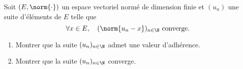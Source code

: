 \begin{enonce}
\begin{exercise}[ID={RMS135 E1441},subtitle={IMT MP 2024},tags={},difficulty={}]

Soit $(E, \norm{\cdot})$ un espace vectoriel normé de dimension finie et $(u_n)$ une suite d’éléments de $E$ telle que
\[
\forall x \in E,\quad (\norm{u_n - x})_{n \in \N} \text{ converge}.
\]
\begin{enumerate}
  \item Montrer que la suite $(u_n)_{n \in \N}$ admet une valeur d’adhérence.
  \item Montrer que la suite $(u_n)_{n \in \N}$ converge.
\end{enumerate}

\end{exercise}
\begin{solution}
\end{solution}
\end{enonce}
